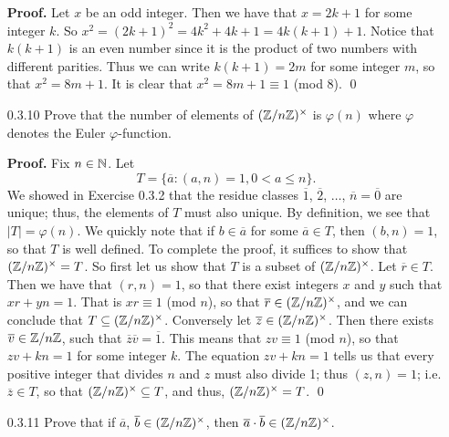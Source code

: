 \begin{enumerate}
      \textbf{Proof.} Let $x$ be an odd integer. Then we have that $x = 2k + 1$
      for some integer $k$. So $x^2 = (2k + 1)^2 = 4k^2 + 4k + 1 =
      4k(k + 1) + 1$. Notice that $k(k + 1)$ is an even number since it is the
      product of two numbers with different parities. Thus we can write
      $k(k + 1) = 2m$ for some integer $m$, so that $x^2 = 8m + 1$. It is clear
      that $x^2 = 8m + 1 \equiv 1$ (mod 8). \qed
   \item[0.3.10]  Prove that the number of elements of $(\mathbb{Z}/n\mathbb{Z})^\times$ is
                  $\varphi(n)$ where $\varphi$ denotes the Euler
                  $\varphi$-function.
                  
      \textbf{Proof.} Fix $n \in \mathbb{N}$. Let
      $$T = \{\overline{a} : (a, n) = 1, 0 < a \le n\}.$$
      We showed in Exercise 0.3.2 that the residue classes $\overline{1}$,
      $\overline{2}$, $\ldots$, $\overline{n} = \overline{0}$ are unique; thus, 
      the elements of $T$ must also unique. By definition, we see that
      $|T| = \varphi(n)$. We quickly note that if $b \in \overline{a}$ for some
      $\overline{a} \in T$, then $(b, n) = 1$, so that $T$ is well defined.
      To complete the proof, it suffices to show that $(\mathbb{Z}/n\mathbb{Z})^\times = T$. So
      first let us show that $T$ is a subset of $(\mathbb{Z}/n\mathbb{Z})^\times$. Let
      $\overline{r} \in T$. Then we have that $(r, n) = 1$, so that there exist 
      integers $x$ and $y$ such that $xr + yn = 1$. That is
      $xr \equiv 1$ (mod $n$), so that $\overline{r} \in (\mathbb{Z}/n\mathbb{Z})^\times$, and
      we can conclude that $T \subseteq (\mathbb{Z}/n\mathbb{Z})^\times$. Conversely let
      $\overline{z} \in (\mathbb{Z}/n\mathbb{Z})^\times$. Then there exists
      $\overline{v} \in \mathbb{Z}/n\mathbb{Z}$, such that
      $\overline{z}\overline{v} = \overline{1}$. This means that
      $zv \equiv 1$ (mod $n$), so that $zv + kn = 1$ for some integer $k$. The
      equation $zv + kn = 1$ tells us that every positive integer that divides 
      $n$ and $z$ must also divide 1; thus $(z, n) = 1$; i.e.
      $\overline{z} \in T$, so that $(\mathbb{Z}/n\mathbb{Z})^\times \subseteq T$, and thus,
      $(\mathbb{Z}/n\mathbb{Z})^\times = T$. \qed
   \item[0.3.11]  Prove that if $\overline{a}$,
                  $\overline{b} \in (\mathbb{Z}/n\mathbb{Z})^\times$, then
                  $\overline{a} \cdot \overline{b} \in (\mathbb{Z}/n\mathbb{Z})^\times$.


\end{enumerate}
